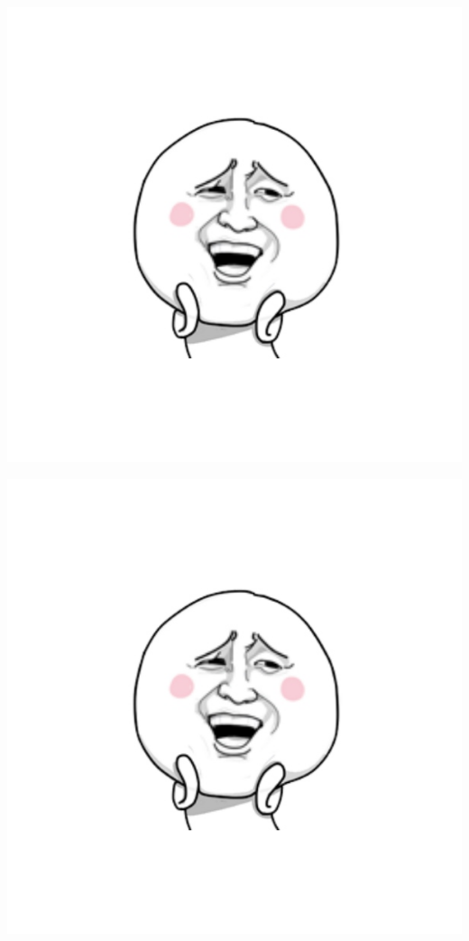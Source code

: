 \documentclass[UTF8]{ctexart}
\begin{document}
\includegraphics{a.png}

\includegraphics[width = .8\textwidth]{a.png}
\end{document}
